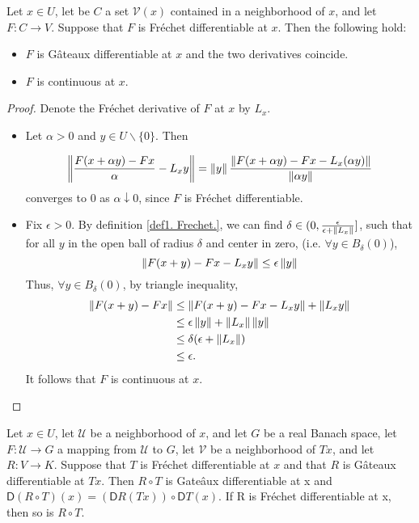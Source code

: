 \begin{lemma}
	Let $x \in U$, let be $C$ a set $\mathcal{V}(x)$ contained in a neighborhood of $x$, and let $F: C \rightarrow V$. Suppose that $F$ is Fr\'echet differentiable at $x$. Then the following hold:
	\begin{itemize}
	\item  $F$ is G\^ateaux differentiable at $x$ and the two derivatives coincide.
	\item $F$ is continuous at $x$.
	\end{itemize}
	\begin{proof}
		Denote the Fr\'echet derivative of $F$ at $x$ by $L_x$.
		\begin{itemize}
			\item Let $\alpha >0$ and $y \in U\backslash\{0\}$. Then
			
			\[
				\left\lVert\frac{F(x+\alpha y)-Fx}{\alpha}-L_xy\right\rVert = \left\lVert y\right\rVert\frac{\left\lVert F(x+\alpha y)-Fx-L_x(\alpha y)\right\rVert}{\left\lVert\alpha y\right\rVert}
			\]
			converges to $0$ as $\alpha \downarrow 0$, since $F$ is Fr\'echet differentiable.
			\item Fix $\epsilon > 0$. By definition \ref{def1. Frechet.}, we can find $\delta \in  (0, \frac{\epsilon}{\epsilon + \left\lVert L_x\right\rVert}]$, such that for all $y$ in the open ball of radius $\delta$ and center in zero, (i.e. $\forall y \in B_\delta(0)$), 
			\[
			   \left\lVert F(x+y)-Fx-L_xy\right\rVert \leq \epsilon \left\lVert y\right\rVert\]
			Thus, $\forall y \in B_\delta(0)$,  by triangle inequality, 
			 \begin{align*}  
			\left\lVert F(x+y)-Fx\right\rVert &\leq \left\lVert F(x+y) -Fx-L_xy\right\rVert + 
			\left\lVert L_xy\right\rVert \\ &\leq \epsilon \left\lVert y\right\rVert + \left\lVert L_x \right\rVert\left\lVert y\right\rVert \\ &\leq \delta(\epsilon + \left\lVert L_x\right\rVert)
			\\
			&\leq \epsilon.
			\end{align*}
			It follows that $F$ is continuous at $x$.
		\end{itemize}
	\end{proof}
\end{lemma}



\begin{fact}
	Let $x\in U$,  let $\mathcal{U}$ be a neighborhood of $x$, and let $G$ be a real Banach space, let $F: \mathcal{U}\rightarrow G$ a mapping from $\mathcal{U}$ to $G$, let $\mathcal{V}$ be a neighborhood of $Tx$, and let $R : V \rightarrow K$.
	Suppose that $T$ is Fr\'echet differentiable at $x$ and that $R$ is G\^ateaux differentiable at $Tx$. Then $R\circ T$ is Gate\^aux differentiable at x and $\mathsf{D}(R \circ T )(x) =
	(\mathsf{D}R(Tx))\circ \mathsf{D}T (x)$. If R is Fr\'echet differentiable at x, then so is $R \circ T $.
\end{fact}

